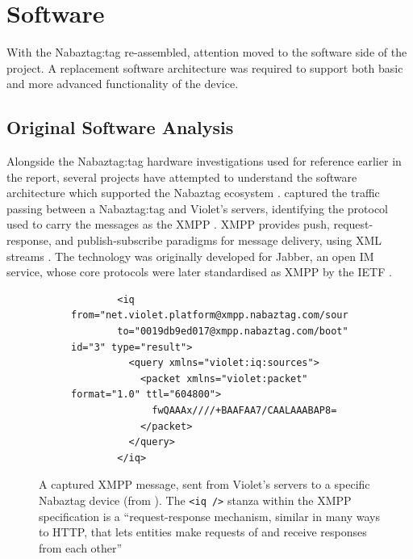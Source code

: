 \documentclass[12pt, a4paper]{article}
\begin{document}
	\section{Software}
	
	With the Nabaztag:tag re-assembled, attention moved to the software side of the project. A replacement software architecture was required to support both basic and more advanced functionality of the device.
	
	\subsection{Original Software Analysis}
	\label{sec:orig_analysis}
	
	Alongside the Nabaztag:tag hardware investigations used for reference earlier in the report, several projects have attempted to understand the software architecture which supported the Nabaztag ecosystem \parencite{Beausset2009, nabaztagxmpp1, nabaztagxmpp2, nabaztagxmpp3, nabaztagsoftwaredissection}. \citeauthor{Beausset2009} captured the traffic passing between a Nabaztag:tag and Violet's servers, identifying the protocol used to carry the messages as the \ac{XMPP} \parencite{Beausset2009}. \ac{XMPP} provides push, request-response, and publish-subscribe paradigms for message delivery, using \ac{XML} streams \parencite{Saint-Andre2005}. The technology was originally developed for Jabber, an open \ac{IM} service, whose core protocols were later standardised as \acs{XMPP} by the \ac{IETF} \parencite{rfc6120}.
	
	\begin{figure}[H]
	\centering
	\begin{subfigure}{0.95\textwidth}
	\begin{verbatim}
		<iq from="net.violet.platform@xmpp.nabaztag.com/sources"
		to="0019db9ed017@xmpp.nabaztag.com/boot" id="3" type="result">
		  <query xmlns="violet:iq:sources">
		    <packet xmlns="violet:packet" format="1.0" ttl="604800">
		      fwQAAAx////+BAAFAA7/CAALAAABAP8=
		    </packet>
		  </query>
		</iq>
	\end{verbatim}
	\end{subfigure}
	\caption[A captured Nabaztag:tag XMPP message]{A captured \protect\ac{XMPP} message, sent from Violet's servers to a specific Nabaztag device (from \protect\parencite{Beausset2009}). The \protect\texttt{<iq />} stanza within the \protect\ac{XMPP} specification is a ``request-response mechanism, similar in many ways to HTTP, that lets entities make requests of and receive responses from each other'' \protect\parencite{Saint-Andre2005}}
	\label{fig:nabaztagxmpp}
	\end{figure}
	
\end{document}
